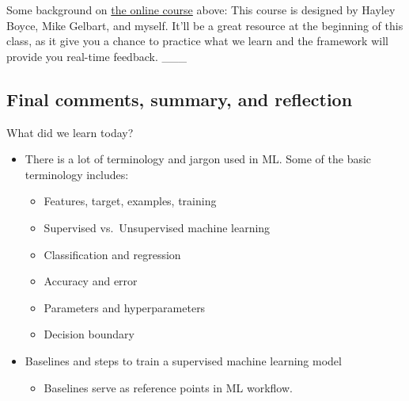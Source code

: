\documentclass[11pt]{article}
\providecommand{\tightlist}{%
      \setlength{\itemsep}{0pt}\setlength{\parskip}{0pt}}
\begin{document}
    Some background on \href{https://ml-learn.mds.ubc.ca/en/}{the online
course} above: This course is designed by Hayley Boyce, Mike Gelbart,
and myself. It'll be a great resource at the beginning of this class, as
it give you a chance to practice what we learn and the framework will
provide you real-time feedback. \_\_\_

    

    \subsection{Final comments, summary, and
reflection}\label{final-comments-summary-and-reflection}

What did we learn today?

\begin{itemize}
\tightlist
\item
  There is a lot of terminology and jargon used in ML. Some of the basic
  terminology includes:

  \begin{itemize}
  \tightlist
  \item
    Features, target, examples, training
  \item
    Supervised vs.~Unsupervised machine learning\\
  \item
    Classification and regression\\
  \item
    Accuracy and error\\
  \item
    Parameters and hyperparameters
  \item
    Decision boundary
  \end{itemize}
\end{itemize}

    \begin{itemize}
\tightlist
\item
  Baselines and steps to train a supervised machine learning model

  \begin{itemize}
  \tightlist
  \item
    Baselines serve as reference points in ML workflow.
  \end{itemize}
\end{itemize}
\end{document}
